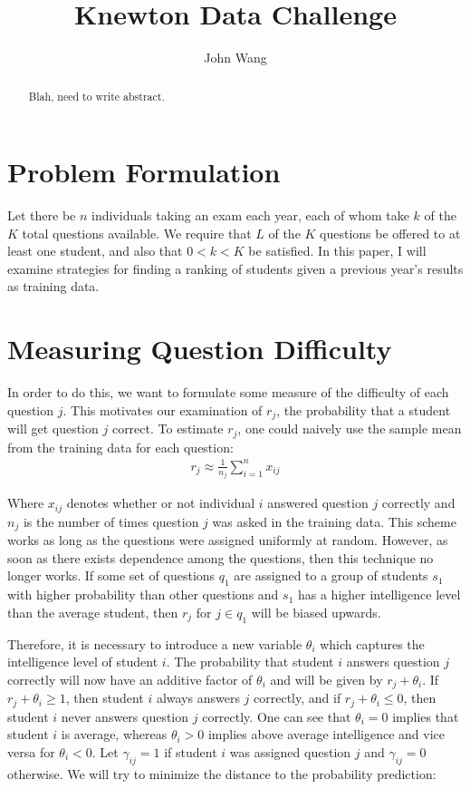 \documentclass[psamsfonts]{amsart}
\title{Knewton Data Challenge}
\author{John Wang}
\begin{document}
\begin{abstract}
Blah, need to write abstract.
\end{abstract}

\maketitle

\tableofcontents

\newpage

\section{Problem Formulation}

Let there be $n$ individuals taking an exam each year, each of whom take $k$ of the $K$ total questions available. We require that $L$ of the $K$ questions be offered to at least one student, and also that $0 < k < K$ be satisfied. In this paper, I will examine strategies for finding a ranking of students given a previous year's results as training data.

\section{Measuring Question Difficulty}

In order to do this, we want to formulate some measure of the difficulty of each question $j$. This motivates our examination of $r_j$, the probability that a student will get question $j$ correct. To estimate $r_j$, one could naively use the sample mean from the training data for each question:
\begin{eqnarray}
r_j \approx \frac{1}{n_j} \sum_{i=1}^n x_{ij}
\end{eqnarray}

Where $x_{ij}$ denotes whether or not individual $i$ answered question $j$ correctly and $n_j$ is the number of times question $j$ was asked in the training data. This scheme works as long as the questions were assigned uniformly at random. However, as soon as there exists dependence among the questions, then this technique no longer works. If some set of questions $q_1$ are assigned to a group of students $s_1$ with higher probability than other questions and $s_1$ has a higher intelligence level than the average student, then $r_j$ for $j \in q_1$ will be biased upwards. 

Therefore, it is necessary to introduce a new variable $\theta_i$ which captures the intelligence level of student $i$. The probability that student $i$ answers question $j$ correctly will now have an additive factor of $\theta_i$ and will be given by $r_j + \theta_i$. If $r_j + \theta_i \geq 1$, then student $i$ always answers $j$ correctly, and if $r_j + \theta_i \leq 0$, then student $i$ never answers question $j$ correctly. One can see that $\theta_i = 0$ implies that student $i$ is average, whereas $\theta_i > 0$ implies above average intelligence and vice versa for $\theta_i < 0$. Let $\gamma_{ij} = 1$ if student $i$ was assigned question $j$ and $\gamma_{ij} = 0$ otherwise. We will try to minimize the distance to the probability prediction:
\end{document}
